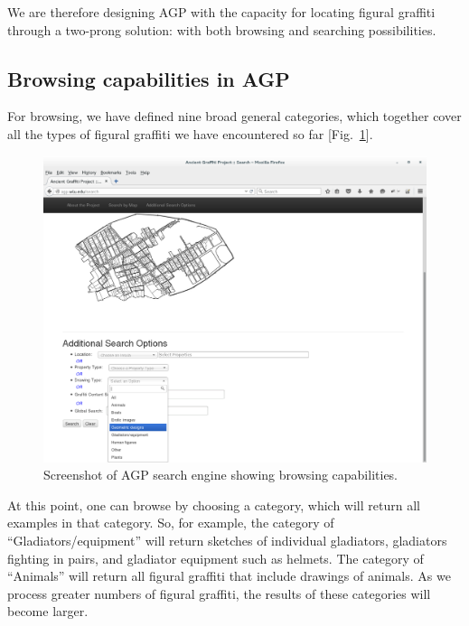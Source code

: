 \documentclass[amsthm,ebook]{saparticle}
\begin{document}
We are therefore designing AGP with the capacity for locating figural graffiti through a two-prong solution: with
both browsing and searching possibilities. 




\subsection{Browsing capabilities in AGP}


\noindent For browsing, we have defined nine broad general categories, which together cover all the types of figural graffiti
we have encountered so far [Fig.~\ref{fig:8}]. 

\begin{figure}[!hbp]
\centering
 \includegraphics[width=\columnwidth]{EAGLE2016BenefielSypniewski-img008.png}
\caption{Screenshot of AGP search engine showing browsing capabilities.}
\label{fig:8}
\end{figure}
 


At this point, one can browse by choosing a category, which will return all examples in that category. So, for example,
the category of ``Gladiators/equipment'' will return sketches of individual gladiators, gladiators fighting in pairs, and
gladiator equipment such as helmets. The category of ``Animals'' will return all figural graffiti that include drawings
of animals. As we process greater numbers of figural graffiti, the results of these categories will become larger.
\end{document}

